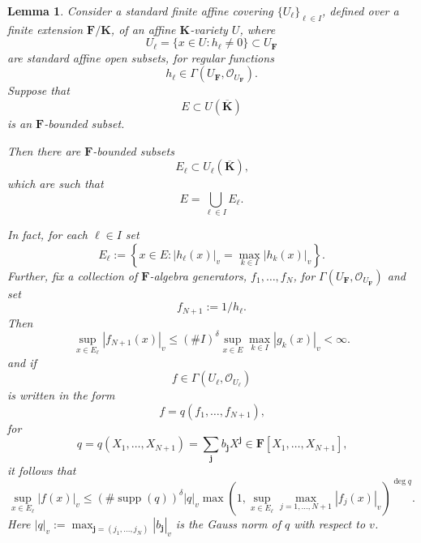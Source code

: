 \documentclass[10pt]{amsart}
\renewcommand{\leq}{\leqslant}
\newcommand{\Osh}{{\mathcal O}}                        %
\newcommand{\KK}{\mathbf{K}}
\newcommand{\FF}{\mathbf{F}}
\newtheorem{lemma}[theorem]{Lemma}
\theoremstyle{definition}
\numberwithin{equation}{section}
\begin{document}
\begin{lemma}\label{effective:Hilb:Null:lemma:2}   Consider a standard finite affine covering $\{U_\ell\}_{\ell \in I}$, defined over a finite extension $\FF / \KK$, of an affine $\KK$-variety $U$, where 
$$
U_{\ell} = \{x \in U : h_\ell \not = 0 \} \subset U_{\FF}
$$ 
are standard affine open subsets, for regular functions 
$$h_\ell \in \Gamma(U_{\FF},\Osh_{U_{\FF}}) \text{.}$$  
Suppose that 
$$E \subset U(\overline{\KK})$$ 
is an $\FF$-bounded subset.  

Then there are $\FF$-bounded subsets 
$$E_\ell \subset U_\ell(\overline{\KK})\text{,}$$ 
which are such that 
$$E = \bigcup_{\ell \in I} E_\ell\text{.}$$  

In fact, for each $\ell \in I$ set
$$
E_\ell := \left\{x \in E : |h_\ell(x)|_v = \max_{k \in I} |h_k(x)|_v \right\} \text{.}
$$
Further,
 fix a collection of $\FF$-algebra generators, $f_1,\dots,f_N$, for $\Gamma(U_{\FF},\Osh_{U_{\FF}})$ and set 
$$f_{N+1} := 1 / h_\ell \text{.}$$  
Then
$$
\sup_{x \in E_{\ell}} \left| f_{N+1} (x) \right|_v \leq (\# I)^\delta \sup_{x \in E} \max_{k \in I} |g_k(x)|_v < \infty \text{.}
$$
and if 
$$
f \in \Gamma(U_{\ell},\Osh_{U_{\ell}})
$$
is written in the form
$$
f = q(f_1,\dots,f_{N+1}) \text{,}
$$
for 
$$
q = q(X_1,\dots,X_{N+1}) = \sum_{\mathbf{j}} b_{\mathbf{j}} X^{\mathbf{j}} \in \FF[X_1,\dots,X_{N+1}] \text{,}
$$
it follows that 
$$
\sup_{x \in E_{\ell}} | f(x)|_v \leq (\# \operatorname{supp}(q))^{\delta} |q|_v \max \left(1,\sup_{x \in E_{\ell}} \max_{j=1,\dots,N+1} |f_j(x)|_v \right)^{\deg q} \text{.}
$$
Here $|q|_v := \max_{\mathbf{j} = (j_1,\dots,j_N)} |b_{\mathbf{j}}|_v $ is the Gauss norm of $q$ with respect to $v$.
\end{lemma}
\end{document}
